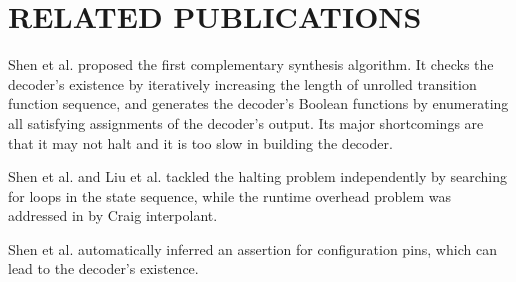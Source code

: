 \documentclass[conference]{IEEEtran}
\begin{document}
 















\section{RELATED PUBLICATIONS}\label{sec_relwork}
%
%

Shen et al.\cite{ShenICCAD09} proposed the first complementary synthesis algorithm.
It checks the decoder's existence by iteratively increasing the length of unrolled transition function sequence,
and generates the decoder's Boolean functions by enumerating all satisfying assignments of the decoder's output.
Its major shortcomings are that it may not halt and it is too slow
in building the decoder.

Shen et al.\cite{ShenTCAD11} and Liu et al.\cite{LiuICCAD11} tackled the halting problem independently by searching for loops in the state sequence,
while the runtime overhead problem was addressed in \cite{ShenTCAD12,LiuICCAD11} by Craig interpolant\cite{Craig}.

Shen et al.\cite{ShenTCAD12} automatically inferred an assertion for configuration pins, 
which can lead to the decoder's existence.
\end{document}
